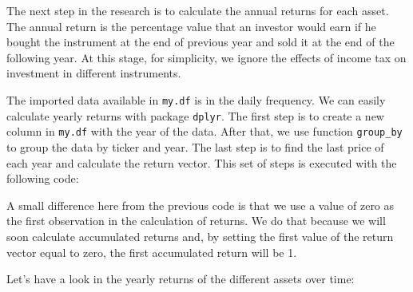 \documentclass[11pt,]{book}
\newenvironment{Shaded}{\begin{snugshade}}{\end{snugshade}}
\newcommand{\KeywordTok}[1]{\textcolor[rgb]{0.27,0.27,0.27}{\textbf{#1}}}
\newcommand{\DataTypeTok}[1]{\textcolor[rgb]{0.27,0.27,0.27}{#1}}
\newcommand{\DecValTok}[1]{\textcolor[rgb]{0.06,0.06,0.06}{#1}}
\newcommand{\StringTok}[1]{\textcolor[rgb]{0.5,0.5,0.5}{#1}}
\newcommand{\OperatorTok}[1]{\textcolor[rgb]{0.81,0.36,0.00}{\textbf{#1}}}
\newcommand{\NormalTok}[1]{#1}
\begin{document}
The next step in the research is to calculate the annual returns for
each asset. The annual return is the percentage value that an investor
would earn if he bought the instrument at the end of previous year and
sold it at the end of the following year. At this stage, for simplicity,
we ignore the effects of income tax on investment in different
instruments.

The imported data available in \texttt{my.df} is in the daily frequency.
We can easily calculate yearly returns with package \texttt{dplyr}. The
first step is to create a new column in \texttt{my.df} with the year of
the data. After that, we use function \texttt{group\_by} to group the
data by ticker and year. The last step is to find the last price of each
year and calculate the return vector. This set of steps is executed with
the following code:

\begin{Shaded}
\end{Shaded}

A small difference here from the previous code is that we use a value of
zero as the first observation in the calculation of returns. We do that
because we will soon calculate accumulated returns and, by setting the
first value of the return vector equal to zero, the first accumulated
return will be 1.

Let's have a look in the yearly returns of the different assets over
time:
\end{document}
